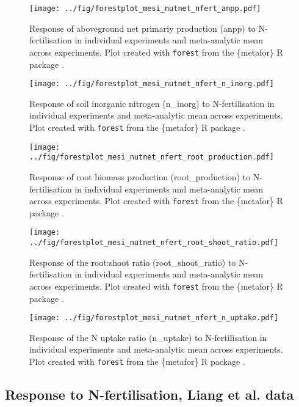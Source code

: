\documentclass{myreport}
\begin{document}
\begin{figure}[h]
\centering
\texttt{[image: ../fig/forestplot\_mesi\_nutnet\_nfert\_anpp.pdf]}
\caption{Response of aboveground net primariy production (anpp) to N-fertilisation in individual experiments and meta-analytic mean across experiments. Plot created with \texttt{forest} from the \{metafor\} R package \cite{viechtbauer_conducting_2010}.}
\end{figure}

\begin{figure}[h]
\centering
\texttt{[image: ../fig/forestplot\_mesi\_nutnet\_nfert\_n\_inorg.pdf]}
\caption{Response of soil inorganic nitrogen (n\_inorg) to N-fertilisation in individual experiments and meta-analytic mean across experiments. Plot created with \texttt{forest} from the \{metafor\} R package \cite{viechtbauer_conducting_2010}.}
\end{figure}

\begin{figure}[h]
\centering
\texttt{[image: ../fig/forestplot\_mesi\_nutnet\_nfert\_root\_production.pdf]}
\caption{Response of root biomass production (root\_production) to N-fertilisation in individual experiments and meta-analytic mean across experiments. Plot created with \texttt{forest} from the \{metafor\} R package \cite{viechtbauer_conducting_2010}.}
\end{figure}

\begin{figure}[h]
\centering
\texttt{[image: ../fig/forestplot\_mesi\_nutnet\_nfert\_root\_shoot\_ratio.pdf]}
\caption{Response of the root:shoot ratio (root\_shoot\_ratio) to N-fertilisation in individual experiments and meta-analytic mean across experiments. Plot created with \texttt{forest} from the \{metafor\} R package \cite{viechtbauer_conducting_2010}.}
\end{figure}

\begin{figure}[h]
\centering
\texttt{[image: ../fig/forestplot\_mesi\_nutnet\_nfert\_n\_uptake.pdf]}
\caption{Response of the N uptake ratio (n\_uptake) to N-fertilisation in individual experiments and meta-analytic mean across experiments. Plot created with \texttt{forest} from the \{metafor\} R package \cite{viechtbauer_conducting_2010}.}
\end{figure}

\clearpage

\subsection{Response to N-fertilisation, Liang et al. data}
\end{document}
